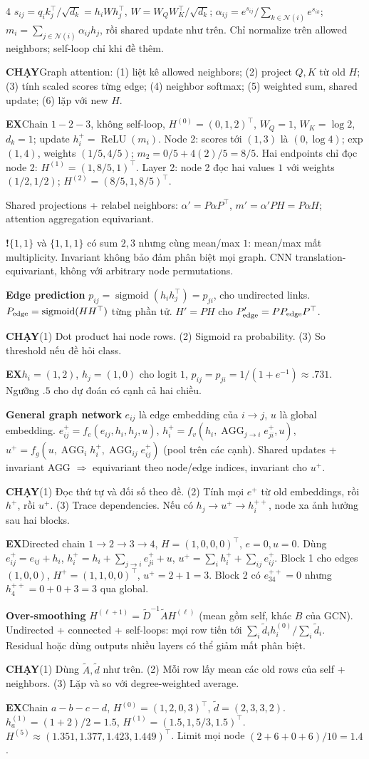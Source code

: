 \documentclass[a4paper]{article}
\newcommand{\run}[1]{\key{CHẠY}#1}
\newcommand{\key}[1]{\par\textcolor{structure}{\textbf{#1}}\enspace}
\newcommand{\note}[4]{\par\begingroup\setlength{\fboxsep}{0.15pt}%
  \noindent\colorbox{#1}{\parbox{\dimexpr\linewidth-2\fboxsep\relax}{%
    \RaggedRight\textcolor{#2}{\textbf{#3}}\enspace #4}}%
  \endgroup\par}
\newcommand{\trap}[1]{\note{warningbg}{warning}{!}{#1}}
\newcommand{\ex}[1]{\note{examplebg}{example}{EX}{#1}}
\begin{document}
\begin{multicols*}{4}
$s_{ij}=q_ik_j^\top/\sqrt{d_k}=h_iWh_j^\top$, $W=W_QW_K^\top/\sqrt{d_k}$;
$\alpha_{ij}=e^{s_{ij}}/\sum_{k\in\mathcal N(i)}e^{s_{ik}}$;
$m_i=\sum_{j\in\mathcal N(i)}\alpha_{ij}h_j$, rồi shared update như trên. Chỉ normalize trên allowed neighbors; self-loop chỉ khi đề thêm.
\run{Graph attention: (1) liệt kê allowed neighbors; (2) project $Q,K$ từ old $H$; (3) tính scaled scores từng edge; (4) neighbor softmax; (5) weighted sum, shared update; (6) lặp với new $H$.}
\ex{Chain $1-2-3$, không self-loop, $H^{(0)}=(0,1,2)^\top$, $W_Q=1$, $W_K=\log2$, $d_k=1$; update $h_i^+=\operatorname{ReLU}(m_i)$. Node 2: scores tới $(1,3)$ là $(0,\log4)$; exp $(1,4)$, weights $(1/5,4/5)$; $m_2=0/5+4(2)/5=8/5$. Hai endpoints chỉ đọc node 2: $H^{(1)}=(1,8/5,1)^\top$. Layer 2: node 2 đọc hai values $1$ với weights $(1/2,1/2)$; $H^{(2)}=(8/5,1,8/5)^\top$.}
Shared projections + relabel neighbors: $\alpha'=P\alpha P^\top$, $m'=\alpha'PH=P\alpha H$; attention aggregation equivariant.
\trap{$\{1,1\}$ và $\{1,1,1\}$ có sum $2,3$ nhưng cùng mean/max $1$: mean/max mất multiplicity. Invariant không bảo đảm phân biệt mọi graph. CNN translation-equivariant, không với arbitrary node permutations.}

\key{Edge prediction}
$p_{ij}=\operatorname{sigmoid}(h_i h_j^\top)=p_{ji}$, cho undirected links.
$P_{\rm edge}=\operatorname{sigmoid}(HH^\top)$ từng phần tử. $H'=PH$ cho $P'_{\rm edge}=P P_{\rm edge}P^\top$.
\run{(1) Dot product hai node rows. (2) Sigmoid ra probability. (3) So threshold nếu đề hỏi class.}
\ex{$h_i=(1,2)$, $h_j=(1,0)$ cho logit $1$, $p_{ij}=p_{ji}=1/(1+e^{-1})\approx.731$. Ngưỡng $.5$ cho dự đoán có cạnh cả hai chiều.}
\key{General graph network}
$e_{ij}$ là edge embedding của $i\to j$, $u$ là global embedding.
$e_{ij}^+=f_e(e_{ij},h_i,h_j,u)$,
$h_i^+=f_v(h_i,\operatorname{AGG}_{j\to i}e_{ji}^+,u)$,
$u^+=f_g(u,\operatorname{AGG}_i h_i^+,\operatorname{AGG}_{ij}e_{ij}^+)$ (pool trên các cạnh).
Shared updates + invariant AGG $\Rightarrow$ equivariant theo node/edge indices, invariant cho $u^+$.
\run{(1) Đọc thứ tự và đối số theo đề. (2) Tính mọi $e^+$ từ old embeddings, rồi $h^+$, rồi $u^+$. (3) Trace dependencies. Nếu có $h_j\to u^+\to h_i^{++}$, node xa ảnh hưởng sau hai blocks.}
\ex{Directed chain $1\to2\to3\to4$, $H=(1,0,0,0)^\top$, $e=0,u=0$. Dùng $e_{ij}^+=e_{ij}+h_i$, $h_i^+=h_i+\sum_{j\to i}e_{ji}^++u$, $u^+=\sum_i h_i^++\sum_{ij}e_{ij}^+$. Block 1 cho edges $(1,0,0)$, $H^+=(1,1,0,0)^\top$, $u^+=2+1=3$. Block 2 có $e_{34}^{++}=0$ nhưng $h_4^{++}=0+0+3=3$ qua global.}
\key{Over-smoothing}
$H^{(\ell+1)}=\tilde D^{-1}\tilde A H^{(\ell)}$ (mean gồm self, khác $B$ của GCN).
Undirected + connected + self-loops: mọi row tiến tới $\sum_i\tilde d_i h_i^{(0)}/\sum_i\tilde d_i$. Residual hoặc dùng outputs nhiều layers có thể giảm mất phân biệt.
\run{(1) Dùng $\tilde A,\tilde d$ như trên. (2) Mỗi row lấy mean các old rows của self + neighbors. (3) Lặp và so với degree-weighted average.}
\ex{Chain $a-b-c-d$, $H^{(0)}=(1,2,0,3)^\top$, $\tilde d=(2,3,3,2)$. $h_a^{(1)}=(1+2)/2=1.5$, $H^{(1)}=(1.5,1,5/3,1.5)^\top$. $H^{(5)}\approx(1.351,1.377,1.423,1.449)^\top$. Limit mọi node $(2+6+0+6)/10=1.4$.}


\end{multicols*}
\end{document}
